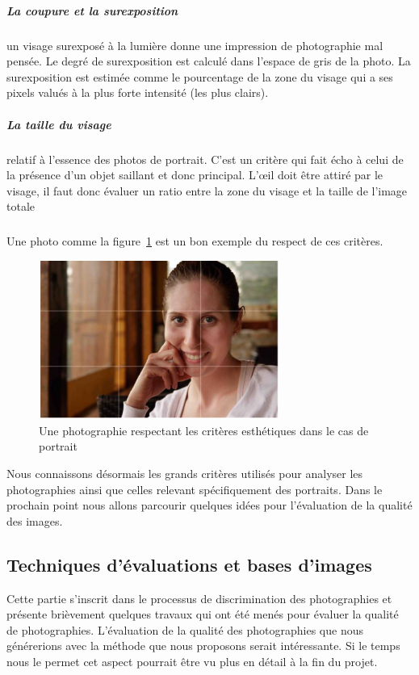 \documentclass[11pt, french]{report-rd-info}
\begin{document}
\subparagraph{La coupure et la surexposition} un visage surexposé à la lumière donne une impression de photographie mal pensée. Le degré de  surexposition est calculé dans l’espace de gris de la photo. La surexposition est estimée comme le pourcentage de la zone du visage qui a ses pixels valués à la plus forte intensité (les plus clairs).
\subparagraph{La taille du visage} relatif à l’essence des photos de portrait. C'est un critère qui fait écho à celui de la présence d'un objet saillant et donc principal. L’œil doit être attiré par le visage, il faut donc évaluer un ratio entre la zone du visage et la taille de l’image totale
\subparagraph*{}
Une photo comme la figure~\ref{fig:VisageAgreable} est un bon exemple du respect de ces critères.
\begin{figure}
	\centering
	\includegraphics[width=0.7\textwidth]{Images/ea_visageagreable}
	\caption{Une photographie respectant les critères esthétiques dans le cas de portrait\cite{Males2013}}
	\label{fig:VisageAgreable}
\end{figure}
Nous connaissons désormais les grands critères utilisés pour analyser les photographies ainsi que celles relevant spécifiquement des portraits. Dans le prochain point nous allons parcourir quelques idées pour l'évaluation de la qualité des images.
\subsection{Techniques d’évaluations et bases d’images}
Cette partie s’inscrit dans le processus de discrimination des photographies et présente brièvement quelques travaux qui ont été menés pour évaluer la qualité de photographies. L’évaluation de la qualité des photographies que nous générerions avec la méthode que nous proposons serait intéressante. Si le temps nous le permet cet aspect pourrait être vu plus en détail à la fin du projet.
\end{document}
